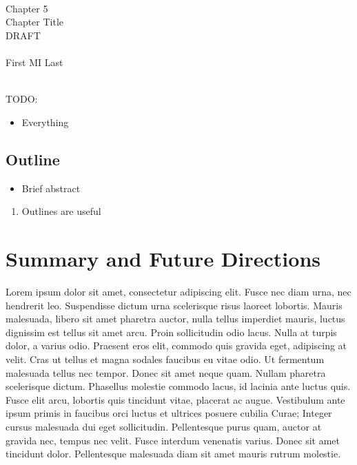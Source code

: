 \documentclass[draftthesis,fullpage,offcenter]{uiucthesis2009}
\begin{document}
		
	\setcounter{chapter}{4}
	\mainmatter
	
	\begin{center}
	~\\~\\~\\
		{\Large Chapter 5\\}
		{\LARGE Chapter Title\\}
		{\Huge DRAFT\\}~\\
		{\Large First MI Last\\}
	\end{center}
	~\\
	{\Large TODO:}
	\begin{itemize}
		\item Everything
	\end{itemize}

	\thispagestyle{empty}
	\newpage
	
	\section*{Outline}
	
	\begin{itemize}
		\item Brief abstract
	\end{itemize}
	\begin{enumerate}
		\item Outlines are useful
	\end{enumerate}
	
	\thispagestyle{empty}
	\setcounter{page}{\pageref{ch4:end}}
	\newpage
\else
\fi
	
\graphicspath{{./fig_ch5/}}


\chapter{Summary and Future Directions}

Lorem ipsum dolor sit amet, consectetur adipiscing elit. Fusce nec diam urna, 
nec hendrerit leo. Suspendisse dictum urna scelerisque risus laoreet lobortis. 
Mauris malesuada, libero sit amet pharetra auctor, nulla tellus imperdiet 
mauris, luctus dignissim est tellus sit amet arcu. Proin sollicitudin odio 
lacus. Nulla at turpis dolor, a varius odio. Praesent eros elit, commodo quis 
gravida eget, adipiscing at velit. Cras ut tellus et magna sodales faucibus eu 
vitae odio. Ut fermentum malesuada tellus nec tempor. Donec sit amet neque quam. 
Nullam pharetra scelerisque dictum. Phasellus molestie commodo lacus, id lacinia 
ante luctus quis. Fusce elit arcu, lobortis quis tincidunt vitae, placerat ac 
augue. Vestibulum ante ipsum primis in faucibus orci luctus et ultrices posuere 
cubilia Curae; Integer cursus malesuada dui eget sollicitudin. Pellentesque 
purus quam, auctor at gravida nec, tempus nec velit. Fusce interdum venenatis 
varius. Donec sit amet tincidunt dolor. Pellentesque malesuada diam sit amet 
mauris rutrum molestie.
\end{document}
